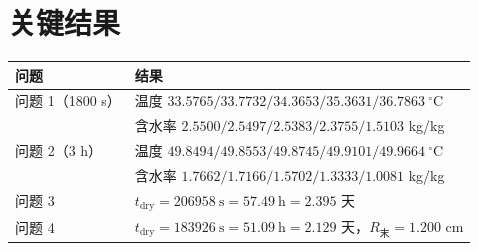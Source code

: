 \documentclass[11pt]{ctexart}
\begin{document}
\section{关键结果}

\begin{table}[h]\centering
\begin{tabular}{ll}
\toprule
问题 & 结果 \\
\midrule
问题 1（1800 s） & 温度 $33.5765/33.7732/34.3653/35.3631/36.7863\ ^\circ$C\\
                 & 含水率 $2.5500/2.5497/2.5383/2.3755/1.5103$ kg/kg\\
问题 2（3 h）    & 温度 $49.8494/49.8553/49.8745/49.9101/49.9664\ ^\circ$C\\
                 & 含水率 $1.7662/1.7166/1.5702/1.3333/1.0081$ kg/kg\\
问题 3           & $t_{\text{dry}}=206958\ \mathrm s=57.49\ \mathrm h=2.395$ 天\\
问题 4           & $t_{\text{dry}}=183926\ \mathrm s=51.09\ \mathrm h=2.129$ 天，$R_{\text{末}}=1.200$ cm\\
\bottomrule
\end{tabular}
\end{table}
\end{document}
